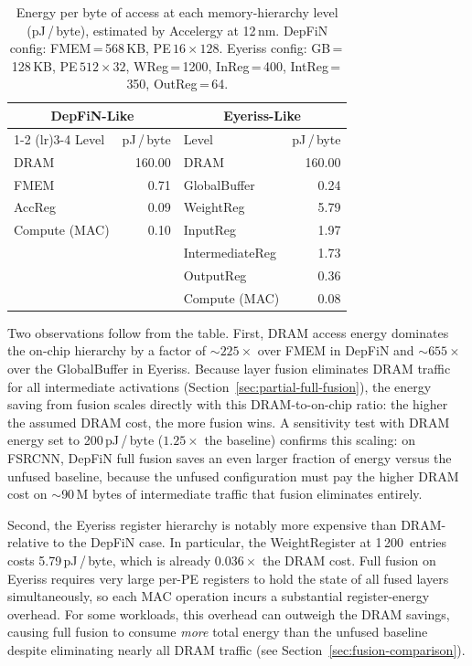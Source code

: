 \begin{table}[htbp]
  \centering
  \caption{Energy per byte of access at each memory-hierarchy level
           (pJ\,/\,byte), estimated by Accelergy at 12\,nm.
           DepFiN config: FMEM\,=\,568\,KB, PE\,$16{\times}128$.
           Eyeriss config: GB\,=\,128\,KB, PE\,$512{\times}32$,
           WReg\,=\,1200, InReg\,=\,400, IntReg\,=\,350,
           OutReg\,=\,64.}
  \label{tab:energy-per-byte}
  \small
  \begin{tabular}{l r @{\qquad\qquad} l r}
    \toprule
    \multicolumn{2}{c}{\textbf{DepFiN-Like}}
      & \multicolumn{2}{c}{\textbf{Eyeriss-Like}} \\
    \cmidrule(lr){1-2} \cmidrule(lr){3-4}
    Level & pJ\,/\,byte & Level & pJ\,/\,byte \\
    \midrule
    DRAM           & 160.00 & DRAM              & 160.00 \\
    FMEM           &  0.71  & GlobalBuffer      &  0.24  \\
    AccReg         &  0.09  & WeightReg         &  5.79  \\
    Compute (MAC)  &  0.10  & InputReg          &  1.97  \\
                   &        & IntermediateReg   &  1.73  \\
                   &        & OutputReg         &  0.36  \\
                   &        & Compute (MAC)     &  0.08  \\
    \bottomrule
  \end{tabular}
\end{table}

Two observations follow from the table.
First, DRAM access energy dominates the on-chip hierarchy by a factor
of $\sim\!225\times$ over FMEM in DepFiN and $\sim\!655\times$ over
the GlobalBuffer in Eyeriss.
Because layer fusion eliminates DRAM traffic for all intermediate
activations (Section~\ref{sec:partial-full-fusion}), the energy
saving from fusion scales directly with this DRAM-to-on-chip ratio:
the higher the assumed DRAM cost, the more fusion wins.
A sensitivity test with DRAM energy set to 200\,pJ\,/\,byte
($1.25\times$ the baseline) confirms this scaling:
on FSRCNN, DepFiN full fusion saves an even larger fraction of energy
versus the unfused baseline, because the unfused configuration must
pay the higher DRAM cost on $\sim$90\,M bytes of intermediate
traffic that fusion eliminates entirely.

Second, the Eyeriss register hierarchy is notably more expensive than
DRAM-relative to the DepFiN case.
In particular, the WeightRegister at 1\,200~entries costs
5.79\,pJ\,/\,byte, which is already $0.036\times$ the DRAM cost.
Full fusion on Eyeriss requires very large per-PE registers to hold
the state of all fused layers simultaneously, so each MAC operation
incurs a substantial register-energy overhead.
For some workloads, this overhead can outweigh the DRAM savings,
causing full fusion to consume \emph{more} total energy than the
unfused baseline despite eliminating nearly all DRAM traffic
(see Section~\ref{sec:fusion-comparison}).
